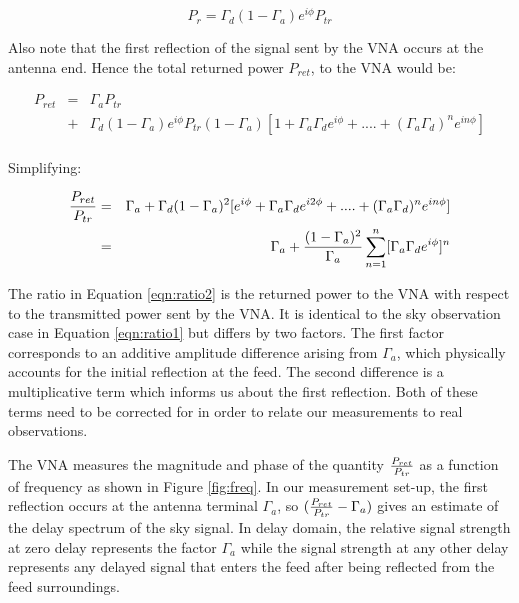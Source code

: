 \documentclass[12pt,preprint]{aastex}
\begin{document}
\begin{equation}
P_{r}= \Gamma_{d}(1-\Gamma_a)e^{i\phi} P_{tr}
\end{equation}

Also note that the first reflection of the signal sent by the VNA occurs at the antenna end. Hence the total returned power $P_{ret}$, to the VNA  would be:

\begin{eqnarray}
P_{ret} & = & \Gamma_{a}P_{tr} \nonumber\\ 
 & + &   \Gamma_{d}(1-\Gamma_a)e^{i\phi} P_{tr}(1-\Gamma_{a}) [1+ \Gamma_{a}\Gamma_{d} e^{i\phi}+  ....+ (\Gamma_{a}\Gamma_{d})^{n}e^{in\phi}]\nonumber\\
 \end{eqnarray}
 
Simplifying:
 
  \begin{eqnarray}\label{eqn:ratio2}
 {P_{ret} \over P_{tr} } & = & \Gamma_{a}
  +  \Gamma_{d}(1-\Gamma_a)^{2} [e^{i\phi}+ \Gamma_{a}\Gamma_{d} e^{i2\phi}+  ....+ (\Gamma_{a}\Gamma_{d})^{n}e^{i n\phi}]\nonumber\\
  & = & \Gamma_{a} + { (1-\Gamma_a)^{2}\over \Gamma_{a} } \displaystyle\sum\limits_{n=1}^{n} [\Gamma_{a}\Gamma_{d}e^{i\phi}]^{n}
   \nonumber\\
\end{eqnarray}

The ratio in Equation \ref{eqn:ratio2} is the returned power to the VNA with
respect to the transmitted power sent by the VNA. It is identical to the sky
observation case in Equation \ref{eqn:ratio1} but differs by two factors. The
first factor corresponds to an additive amplitude difference arising from
$\Gamma_{a}$, which physically accounts for the initial reflection at the feed.
The second difference is a multiplicative term which informs us about the first
reflection. Both of these terms need to be corrected for in order to relate our
measurements to real observations.

The VNA measures the magnitude and phase of the quantity ${P_{ret}\over P_{tr}}$
as a function of frequency as shown in Figure \ref{fig:freq}. In our measurement
set-up, the first reflection occurs at the antenna terminal $\Gamma_{a}$, so
$({P_{ret} \over P_{tr} }  - \Gamma_{a}) $ gives an estimate of the delay
spectrum of the sky signal. In delay domain, the relative signal strength at
zero delay represents the factor $\Gamma_{a}$ while the signal strength at any
other delay represents any delayed signal that enters the feed after being
reflected from the feed surroundings. 
\end{document}
